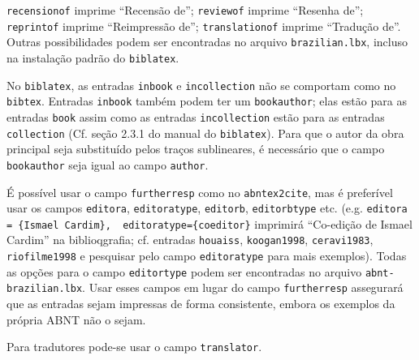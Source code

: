 \documentclass[a4paper]{article}
\begin{document}
\begin{itemize}
\begin{sloppypar}
    \texttt{recensionof} imprime ``Recensão de''; \texttt{reviewof} imprime
    ``Resenha de''; \texttt{reprintof} imprime ``Reimpressão de'';
    \texttt{translationof} imprime ``Tradução de''. Outras possibilidades
    podem ser encontradas no arquivo \texttt{brazilian.lbx}, incluso na
    instalação padrão do \texttt{biblatex}.
  \item No \texttt{biblatex}, as entradas \texttt{inbook} e
    \texttt{incollection} não se comportam como no \texttt{bibtex}. Entradas
    \texttt{inbook} também podem ter um \texttt{bookauthor}; elas estão para
    as entradas \texttt{book} assim como as entradas \texttt{incollection}
    estão para as entradas \texttt{collection} (Cf. seção 2.3.1 do manual
    do \texttt{biblatex}). Para que o autor da obra principal seja
    substituído pelos traços sublineares, é necessário que o campo
    \texttt{bookauthor} seja igual ao campo \texttt{author}.
  \item É possível usar o campo \texttt{furtherresp} como no
    \texttt{abntex2cite}, mas é preferível usar os campos \texttt{editora},
    \texttt{editoratype}, \texttt{editorb}, \texttt{editorbtype} etc. (e.g.
    \verb"editora = {Ismael Cardim},  editoratype={coeditor}" imprimirá
    ``Co-edição de Ismael Cardim'' na biblioqgrafia; cf. entradas
    \texttt{hou\-a\-iss}, \texttt{koogan1998}, \texttt{ceravi1983},
    \texttt{riofilme1998} e pesquisar pelo campo \texttt{editor\-a\-type} para
    mais exemplos). Todas as opções para o campo \texttt{editor\-type} podem
    ser encontradas no arquivo \texttt{abnt-brazilian.lbx}. Usar esses campos
    em lugar do campo \texttt{furtherresp} assegurará que as entradas sejam
    impressas de forma consistente, embora os exemplos da própria ABNT não o
    sejam.
  \item Para tradutores pode-se usar o campo \texttt{translator}.
  \end{sloppypar}
\end{itemize}

\clearpage
\nocite{*}
\printbibliography
\end{document}
